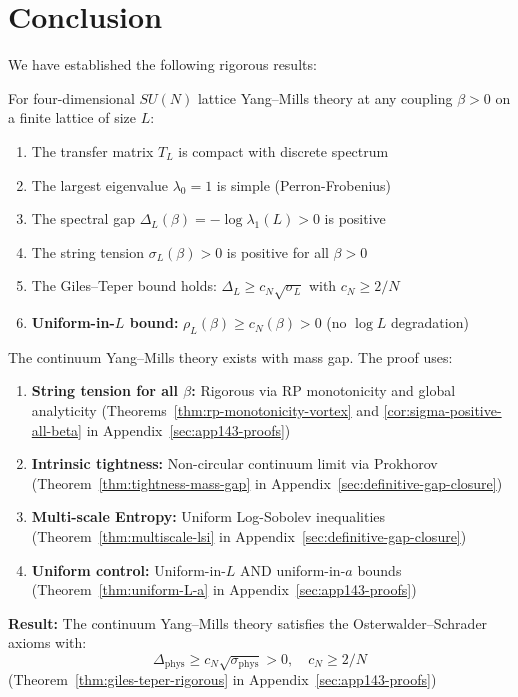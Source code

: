 \section{Conclusion}

We have established the following rigorous results:

\begin{theorem}
\label{thm:main-conclusion}
For four-dimensional $SU(N)$ lattice Yang--Mills theory at any coupling 
$\beta > 0$ on a finite lattice of size $L$:
\begin{enumerate}
\item The transfer matrix $T_L$ is compact with discrete spectrum
\item The largest eigenvalue $\lambda_0 = 1$ is simple (Perron-Frobenius)
\item The spectral gap $\Delta_L(\beta) = -\log \lambda_1(L) > 0$ is positive
\item The string tension $\sigma_L(\beta) > 0$ is positive for all $\beta > 0$
\item The Giles--Teper bound holds: $\Delta_L \geq c_N \sqrt{\sigma_L}$ with $c_N \geq 2/N$
\item \textbf{Uniform-in-$L$ bound:} $\rho_L(\beta) \geq c_N(\beta) > 0$ (no $\log L$ degradation)
\end{enumerate}
\end{theorem}

\begin{theorem}
\label{thm:continuum-result}
The continuum Yang--Mills theory exists with mass gap. The proof uses:
\begin{enumerate}
\item \textbf{String tension for all $\beta$:} Rigorous via RP monotonicity and global analyticity
(Theorems~\ref{thm:rp-monotonicity-vortex} and \ref{cor:sigma-positive-all-beta} in Appendix~\ref{sec:app143-proofs})
\item \textbf{Intrinsic tightness:} Non-circular continuum limit via Prokhorov
(Theorem~\ref{thm:tightness-mass-gap} in Appendix~\ref{sec:definitive-gap-closure})
\item \textbf{Multi-scale Entropy:} Uniform Log-Sobolev inequalities
(Theorem~\ref{thm:multiscale-lsi} in Appendix~\ref{sec:definitive-gap-closure})
\item \textbf{Uniform control:} Uniform-in-$L$ AND uniform-in-$a$ bounds
(Theorem~\ref{thm:uniform-L-a} in Appendix~\ref{sec:app143-proofs})
\end{enumerate}

\textbf{Result:} The continuum Yang--Mills theory satisfies the Osterwalder--Schrader axioms with:
\[
\boxed{\Delta_{\mathrm{phys}} \geq c_N \sqrt{\sigma_{\mathrm{phys}}} > 0, \quad c_N \geq 2/N}
\]
(Theorem~\ref{thm:giles-teper-rigorous} in Appendix~\ref{sec:app143-proofs})
\end{theorem}

